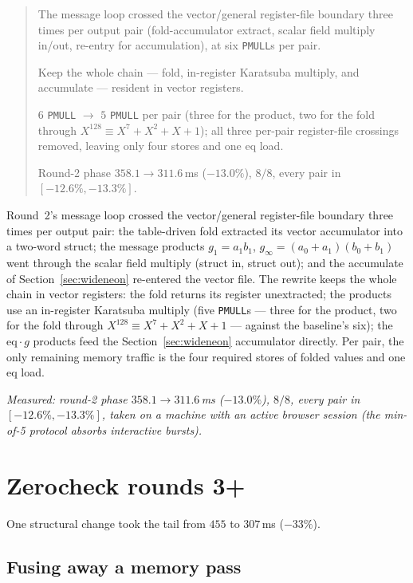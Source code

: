 \documentclass[11pt]{article}
\newcommand{\eq}{\mathrm{eq}}
\newcommand{\code}[1]{\texttt{#1}}
\newenvironment{optsummary}{%
  \begin{quote}\small
  \begin{description}
  \setlength{\itemsep}{1pt}\setlength{\parsep}{0pt}\setlength{\topsep}{2pt}
}{%
  \end{description}
  \end{quote}
}
\begin{document}
\begin{optsummary}
\item[Baseline:] The message loop crossed the vector/general register-file boundary three times per output pair (fold-accumulator extract, scalar field multiply in/out, re-entry for accumulation), at six \code{PMULL}s per pair.
\item[Improvement:] Keep the whole chain --- fold, in-register Karatsuba multiply, and accumulate --- resident in vector registers.
\item[Mechanism:] $6$ \code{PMULL} $\to$ $5$ \code{PMULL} per pair (three for the product, two for the fold through $X^{128}\equiv X^7{+}X^2{+}X{+}1$); all three per-pair register-file crossings removed, leaving only four stores and one eq load.
\item[Result:] Round-2 phase $358.1\to311.6\,$ms ($-13.0\%$), $8/8$, every pair in $[-12.6\%,-13.3\%]$.
\end{optsummary}

Round~2's message loop crossed the vector/general register-file boundary three
times per output pair: the table-driven fold extracted its vector accumulator
into a two-word struct; the message products
$g_1 = a_1 b_1$, $g_\infty = (a_0{+}a_1)(b_0{+}b_1)$ went through the scalar
field multiply (struct in, struct out); and the accumulate of
Section~\ref{sec:wideneon} re-entered the vector file. The rewrite keeps the
whole chain in vector registers: the fold returns its register unextracted;
the products use an in-register Karatsuba multiply (five \code{PMULL}s ---
three for the product, two for the fold through $X^{128}\equiv X^7{+}X^2{+}X{+}1$
--- against the baseline's six); the $\eq\cdot g$ products feed the
Section~\ref{sec:wideneon} accumulator directly. Per pair, the only remaining
memory traffic is the four required stores of folded values and one eq load.

\emph{Measured: round-2 phase $358.1\to311.6\,$ms ($-13.0\%$), $8/8$, every
pair in $[-12.6\%,-13.3\%]$, taken on a machine with an active browser
session (the min-of-5 protocol absorbs interactive bursts).}

\section{Zerocheck rounds 3+}

One structural change took the tail from $455$ to $307$\,ms ($-33\%$).

\subsection{Fusing away a memory pass}\label{sec:tailfuse}
\end{document}
